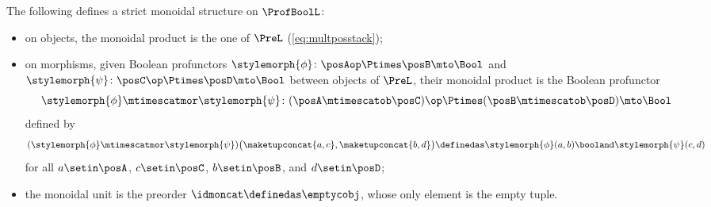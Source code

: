 \begin{lemma}
    \label{lem:ProfBoolL-strict-monoidal}
    The following defines a strict monoidal structure on $\ProfBoolL$:
    \begin{itemize}
        \item on objects, the monoidal product is the one of $\PreL$ (\cref{eq:multposstack});
        \item on morphisms, given Boolean profunctors $\stylemorph{\phi} \colon \posAop \Ptimes \posB \mto \Bool$ and $\stylemorph{\psi} \colon \posC\op \Ptimes \posD \mto \Bool$ between objects of $\PreL$, their monoidal product is the Boolean profunctor
              \begin{equation}
                  \stylemorph{\phi} \mtimescatmor \stylemorph{\psi} \colon (\posA \mtimescatob \posC)\op \Ptimes (\posB \mtimescatob \posD) \mto \Bool
              \end{equation}
              defined by
              \begin{equation}
                  \label{eq:dpmulti}
                  (\stylemorph{\phi} \mtimescatmor \stylemorph{\psi})\bigl(\maketupconcat{a, c}, \maketupconcat{b, d}\bigr)
                  \definedas
                  \stylemorph{\phi}(a, b) \booland \stylemorph{\psi}(c, d)
              \end{equation}
              for all $a \setin \posA$, $c \setin \posC$, $b \setin \posB$, and $d \setin \posD$;
        \item the monoidal unit is the preorder $\idmoncat \definedas \emptycobj$, whose only element is the empty tuple.
    \end{itemize}
\end{lemma}



